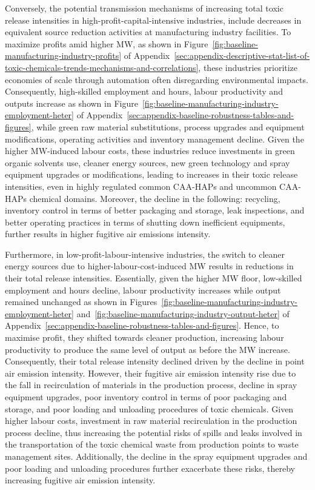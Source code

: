 \documentclass{C:/Users/david/OneDrive/Documents/ULMS/PhD/Thesis/chapter3/src/climate_change/latex/Economic_Journal/OUP-EJ}
\begin{document}
    Conversely, the potential transmission mechanisms of increasing total toxic release intensities in high-profit-capital-intensive industries, include decreases in equivalent source reduction activities at manufacturing industry facilities. To maximize profits amid higher MW, as shown in Figure~\ref{fig:baseline-manufacturing-industry-profits} of Appendix~\ref{sec:appendix-descriptive-stat-list-of-toxic-chemicals-trends-mechanisms-and-correlations}, these industries prioritize economies of scale through automation often disregarding environmental impacts. Consequently, high-skilled employment and hours, labour productivity and outputs increase as shown in Figure~\ref{fig:baseline-manufacturing-industry-employment-heter} of Appendix~\ref{sec:appendix-baseline-robustness-tables-and-figures}, while green raw material substitutions, process upgrades and equipment modifications, operating activities and inventory management decline. Given the higher MW-induced labour costs, these industries reduce investments in green organic solvents use, cleaner energy sources, new green technology and spray equipment upgrades or modifications, leading to increases in their toxic release intensities, even in highly regulated common CAA-HAPs and uncommon CAA-HAPs chemical domains. Moreover, the decline in the following: recycling, inventory control in terms of better packaging and storage, leak inspections, and better operating practices in terms of shutting down inefficient equipments, further results in higher fugitive air emissions intensity.
    

    Furthermore, in low-profit-labour-intensive industries, the switch to cleaner energy sources due to higher-labour-cost-induced MW results in reductions in their total release intensities. Essentially, given the higher MW floor, low-skilled employment and hours decline, labour productivity increases while output remained unchanged as shown in Figures~\ref{fig:baseline-manufacturing-industry-employment-heter} and~\ref{fig:baseline-manufacturing-industry-output-heter} of Appendix~\ref{sec:appendix-baseline-robustness-tables-and-figures}. Hence, to maximise profit, they shifted towards cleaner production, increasing labour productivity to produce the same level of output as before the MW increase. Consequently, their total release intensity declined driven by the decline in point air emission intensity. However, their fugitive air emission intensity rise due to the fall in recirculation of materials in the production process, decline in spray equipment upgrades, poor inventory control in terms of poor packaging and storage, and poor loading and unloading procedures of toxic chemicals. Given higher labour costs, investment in raw material recirculation in the production process decline, thus increasing the potential risks of spills and leaks involved in the transportation of the toxic chemical waste from production points to waste management sites. Additionally, the decline in the spray equipment upgrades and poor loading and unloading procedures further exacerbate these risks, thereby increasing fugitive air emission intensity.
\end{document}
